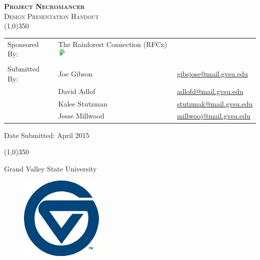 \documentclass{article}
\newcommand{\ASSNMT}{Project Necromancer}
\newcommand{\CLASS}{Design Presentation Handout}
\newcommand{\Footer}{Grand Valley State University}
\newcommand{\DATE}{April 2015}
\numberwithin{figure}{section}
\numberwithin{equation}{section}
\begin{document}
\begin{flushleft}

\textsc{\LARGE \bfseries \ASSNMT}\\

\textsc{\Large \CLASS}\\[0.2cm]
\linethickness{0.5mm}
{\color{ForestGreen}\line(1,0){350}} \\ [1.0cm]

\begin{flushleft} \large
\begin{tabular}{lll}
  Sponsored By: & The Rainforest Connection (RFCx) \includegraphics[height=0.4cm]{rfcxlogo} & \\
                &               & \\
  Submitted By: & Joe Gibson    & \href{mailto:gibsjose@mail.gvsu.edu}{gibsjose@mail.gvsu.edu}\\
              & David Adlof     & \href{mailto:adlofd@mail.gvsu.edu}{adlofd@mail.gvsu.edu}\\
              & Kalee Stutzman  & \href{mailto:stutzmak@mail.gvsu.edu}{stutzmak@mail.gvsu.edu}\\
              & Jesse Millwood  & \href{mailto:millwooj@mail.gvsu.edu}{millwooj@mail.gvsu.edu}\\
\end{tabular}

\bigskip

\bigskip
Date Submitted: \DATE
\end{flushleft}

\smallskip
{\color{ForestGreen}\line(1,0){350}} \\ [1.0cm]

\vfill

\begin{center}
{\large \Footer}
\end{center}
\begin{figure}[H]
  \centering
  \includegraphics[width=.1\textwidth]{small_gvsu}
\end{figure}
\end{flushleft}
\end{document}

